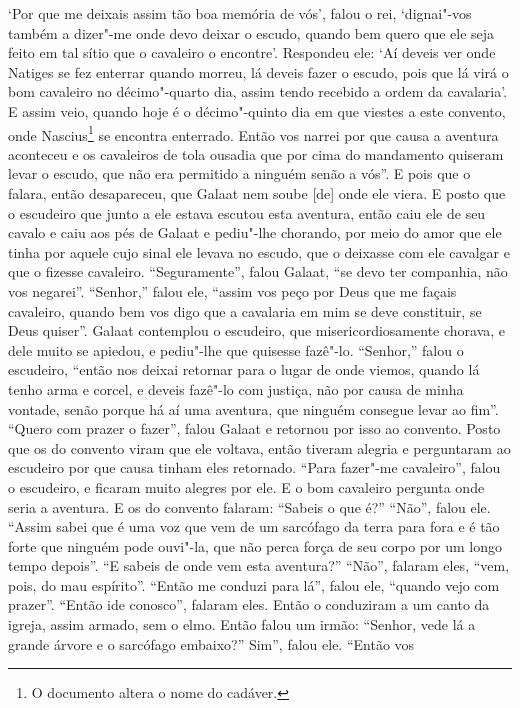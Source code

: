 `Por que me deixais assim tão boa memória de vós’, falou o rei, ‘dignai"-vos
também a dizer"-me onde devo deixar o escudo, quando bem quero que ele seja
feito em tal sítio que o cavaleiro o encontre’. Respondeu ele: ‘Aí deveis ver
onde Natiges se fez enterrar quando morreu, lá deveis fazer o escudo, pois que
lá virá o bom cavaleiro no décimo"-quarto dia, assim tendo recebido a ordem da
cavalaria’. E assim veio, quando hoje é o décimo"-quinto dia em que viestes a
este convento, onde Nascius\footnote{ O documento altera o
nome do cadáver.}  se encontra enterrado. Então vos narrei por que
causa a aventura aconteceu e os cavaleiros de tola ousadia que por cima do
mandamento quiseram levar o escudo, que não era permitido a ninguém senão a
vós”. E pois que o falara, então desapareceu, que Galaat nem
soube [de] onde ele viera. E posto que o escudeiro que junto a ele estava escutou
esta aventura, então caiu ele de seu cavalo e caiu aos pés de Galaat e
pediu"-lhe chorando, por meio do amor que ele tinha por aquele cujo sinal ele
levava no escudo, que o deixasse com ele cavalgar e que o fizesse cavaleiro.
“Seguramente”, falou Galaat, “se devo ter companhia, não vos negarei”.
“Senhor,” falou ele, “assim vos peço por Deus que me façais cavaleiro, quando
bem vos digo que a cavalaria em mim se deve constituir, se Deus quiser”. Galaat
contemplou o escudeiro, que misericordiosamente chorava, e dele muito se
apiedou, e pediu"-lhe que quisesse fazê"-lo. “Senhor,” falou o escudeiro, “então
nos deixai retornar para o lugar de onde viemos, quando lá tenho arma e corcel,
e deveis fazê"-lo com justiça, não por causa de minha vontade, senão porque há
aí uma aventura, que ninguém consegue levar ao fim”. “Quero com prazer o
fazer”, falou Galaat e retornou por isso ao convento. Posto que os do convento
viram que ele voltava, então tiveram alegria e perguntaram ao escudeiro por que
causa tinham eles retornado. “Para fazer"-me cavaleiro”, falou o escudeiro, e
ficaram muito alegres por ele. E o bom cavaleiro pergunta onde seria a
aventura. E os do convento falaram: “Sabeis o que é?” “Não”, falou ele. “Assim
sabei que é uma voz que vem de um sarcófago da terra para fora e é tão forte
que ninguém pode ouvi"-la, que não perca força de seu corpo por um longo tempo
depois”. “E sabeis de onde vem esta aventura?” “Não”, falaram eles, “vem,
pois, do mau espírito”. “Então me conduzi para lá”, falou ele, “quando vejo com
prazer”. “Então ide conosco”, falaram eles. Então o conduziram a um canto da
igreja, assim armado, sem o elmo. Então falou um irmão: “Senhor, vede lá a
grande árvore e o sarcófago embaixo?” Sim”,  falou ele. “Então vos

